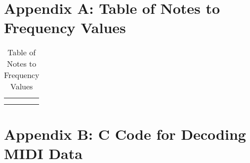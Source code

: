 \documentclass[10pt]{article}
\begin{document}

\appendix

\section{Appendix A: Table of Notes to Frequency Values}\label{sec:-table-of-notes-to-frequency-values}




\begin{table}[h]
    \centering
    \begin{tabular}{c|c}
         &  \\
         & 
    \end{tabular}
    \caption{Table of Notes to Frequency Values}
    \label{tab:pianonotestofrequency}
\end{table}

\section{Appendix B: C Code for Decoding MIDI Data}\label{sec:appendix-b:-c-code-for-decoding-midi-data}

\end{document}
